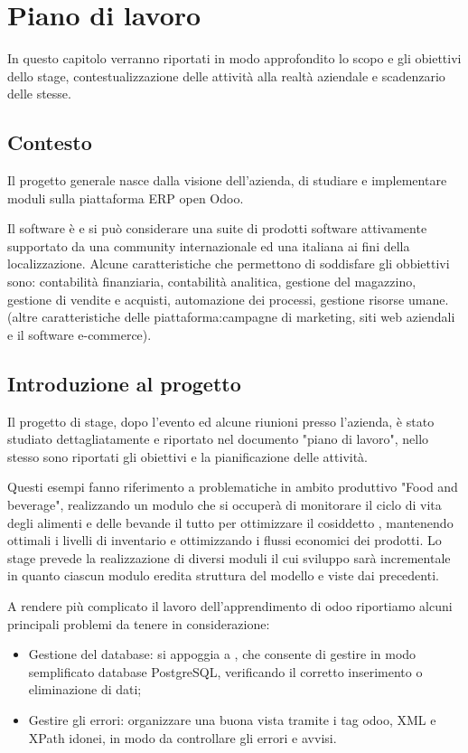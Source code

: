 
\hypertarget{(chap:capitolo2)}{}
\chapter{Piano di lavoro}
In questo capitolo verranno riportati in modo approfondito lo scopo e gli obiettivi dello stage, contestualizzazione delle attività alla realtà aziendale e scadenzario delle stesse.

\section{Contesto}
Il progetto generale nasce dalla visione dell'azienda, di studiare e implementare moduli sulla piattaforma ERP open Odoo.

Il software è  e si può considerare una suite di prodotti software attivamente supportato da una community internazionale ed una italiana ai fini della localizzazione.
Alcune caratteristiche che permettono di soddisfare gli obbiettivi sono: contabilità finanziaria, contabilità analitica, gestione del magazzino, gestione di vendite e acquisti, automazione dei processi, gestione risorse umane. (altre caratteristiche delle piattaforma:campagne di marketing, siti web aziendali e il software e-commerce).

\section{Introduzione al progetto}
Il progetto di stage, dopo l'evento  ed alcune riunioni presso l'azienda, è stato studiato dettagliatamente e riportato nel documento "piano di lavoro", nello stesso sono riportati gli obiettivi e la pianificazione delle attività.

Questi esempi fanno riferimento a problematiche in ambito produttivo "Food and beverage", realizzando un modulo che si occuperà di monitorare il ciclo di vita degli alimenti e delle bevande il tutto per ottimizzare il cosiddetto , mantenendo ottimali i livelli di inventario e ottimizzando i flussi economici dei prodotti.
Lo stage prevede la realizzazione di diversi moduli il cui sviluppo sarà incrementale in quanto ciascun modulo eredita struttura del modello e viste dai precedenti.

A rendere più complicato il lavoro dell'apprendimento di odoo riportiamo alcuni principali problemi da tenere in considerazione:
\begin{itemize}
	\item Gestione del database: si appoggia a , che consente di gestire in modo semplificato database PostgreSQL, verificando il corretto inserimento o eliminazione di dati;
	\item Gestire gli errori: organizzare una buona vista tramite i tag odoo, XML e XPath idonei, in modo da controllare gli errori e avvisi.
\end{itemize}

